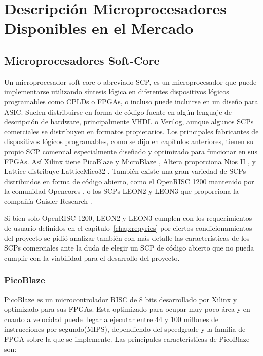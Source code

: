 
\chapter{Descripción Microprocesadores Disponibles en el Mercado} %
	\section{Microprocesadores Soft-Core}
	Un microprocesador soft-core o abreviado SCP, es un microprocesador que puede implementarse utilizando síntesis lógica en diferentes dispositivos lógicos programables como CPLDs o FPGAs, o incluso puede incluirse en un diseño para ASIC.
 	Suelen distribuirse en forma de código fuente en algún lenguaje de descripción de hardware, principalmente VHDL o Verilog, aunque algunos SCPs
 	comerciales se distribuyen en formatos propietarios.
	Los principales fabricantes de dispositivos lógicos programables, como se dijo en capítulos anteriores, tienen su propio  SCP comercial especialmente
	diseñado y optimizado para funcionar en sus FPGAs. Así Xilinx tiene PicoBlaze \cite{Etiqueta15} y MicroBlaze \cite{Etiqueta16}, Altera
	proporciona Nios II \cite{Etiqueta17}, y Lattice distribuye LatticeMico32 \cite{Etiqueta18}. También existe una gran variedad de SCPs
	distribuidos en forma de código abierto, como el OpenRISC 1200 \cite{Etiqueta19} mantenido por la comunidad Opencores \cite{Etiqueta20}, o los  SCPs
	LEON2 y LEON3 \cite{Etiqueta21} \cite{Etiqueta22} que proporciona la compañía Gaisler Research \cite{Etiqueta23}.
		
Si bien solo OpenRISC 1200, LEON2 y LEON3 cumplen con los requerimientos de usuario definidos en el capitulo~\ref{chap:reqyries} por ciertos condicionamientos del proyecto se pidió analizar también con más detalle las características de los SCPs comerciales ante la duda de elegir un SCP de código abierto que no pueda cumplir con la viabilidad para el desarrollo del proyecto. %
	\subsection{PicoBlaze}
	
	PicoBlaze es un microcontrolador RISC de 8 bits desarrollado por Xilinx y optimizado para sus FPGAs. Esta optimizado para ocupar muy poco área y en cuanto a velocidad puede llegar a ejecutar entre 44 y 100 millones de instrucciones por segundo(MIPS), dependiendo del speedgrade y la familia de FPGA sobre la que se implemente. Las principales características de PicoBlaze son:
	
